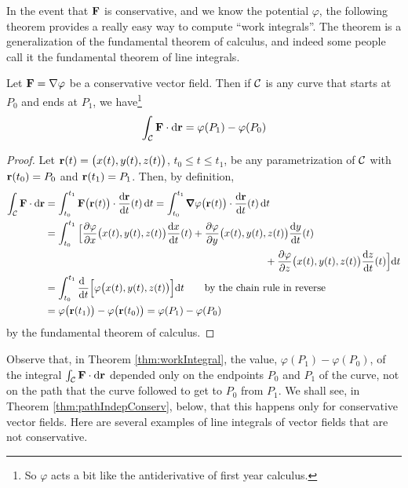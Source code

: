 In the event that $\mathbf{F}$ is conservative, and we know the potential $\varphi$,
the following theorem provides a really easy way to compute
``work integrals''. The theorem is a generalization of the fundamental theorem 
of calculus, and indeed some people call it the fundamental theorem of line integrals.
\begin{theorem}\label{thm:workIntegral}
Let $\mathbf{F}=\nabla\varphi$ be a conservative vector field. Then if $\mathcal{C}$ is
any curve that starts at $P_0$ and ends at $P_1$, we have\footnote{So $\varphi$
acts a bit like the antiderivative of first year calculus.}
\begin{equation*}
\int_{\mathcal{C}}\mathbf{F}\cdot\mathrm{d}\mathbf{r} =\varphi(P_1)-\varphi(P_0)
\end{equation*}
\end{theorem}
\begin{proof}
Let $\mathbf{r}(t)=\big(x(t),y(t),z(t)\big)$, $t_0\le t\le t_1$, 
be any parametrization of $\mathcal{C}$ with $\mathbf{r}(t_0)=P_0$ and $\mathbf{r}(t_1)=P_1$. 
Then, by definition,
\begin{align*}
\int_\cC\vF\cdot\dee{\vr}
&=\int_{t_0}^{t_1}\vF\big(\vr(t)\big)\cdot\diff{\vr}{t}(t)\,\dee{t}
=\int_{t_0}^{t_1}\vnabla\varphi\big(\vr(t)\big)\cdot\diff{\vr}{t}(t)\,\dee{t}
\\
&=\int_{t_0}^{t_1}\Big[
\frac{\partial\varphi}{\partial x}\big(x(t),y(t),z(t)\big)
                        \diff{x}{t}(t)
+\frac{\partial\varphi}{\partial y}\big(x(t),y(t),z(t)\big)
                        \diff{y}{t}(t) \\&\hskip3in
+\frac{\partial\varphi}{\partial z}\big(x(t),y(t),z(t)\big)
                        \diff{z}{t}(t) 
\Big]\dee{t} \\
&=\int_{t_0}^{t_1}\diff{\ }{t}\Big[\varphi\big(x(t),y(t),z(t)\big)
\Big]\dee{t} 
\qquad\text{by the chain rule in reverse}\\
&=\varphi\big(\vr(t_1)\big) - \varphi\big(\vr(t_0)\big)
=\varphi(P_1) - \varphi(P_0)
\end{align*}
by the fundamental theorem of calculus.
\end{proof}
Observe that, in Theorem \ref{thm:workIntegral}, the value,
$\varphi(P_1)-\varphi(P_0)$, of the integral $\int_{\mathcal{C}}\mathbf{F}\cdot\mathrm{d}\mathbf{r}$
depended only on the endpoints $P_0$ and $P_1$ of the curve, not on the path 
that the curve followed to get to $P_0$ from $P_1$. We shall see, in Theorem
\ref{thm:pathIndepConserv}, below, that this happens only for 
conservative vector fields.
Here are several examples of line integrals of vector fields that are not
conservative.


